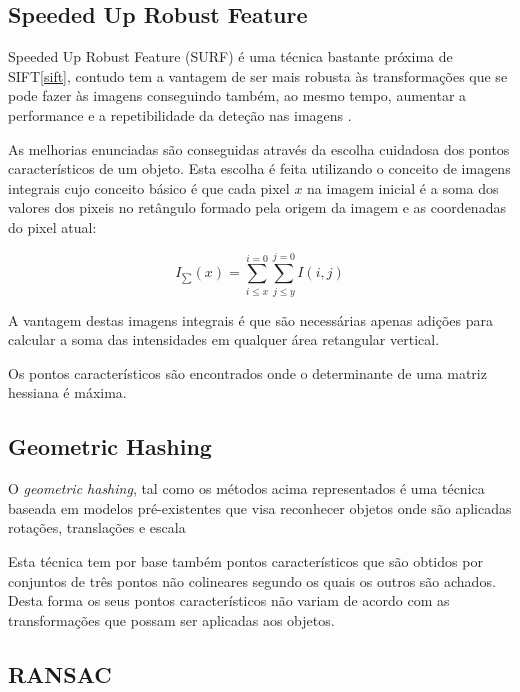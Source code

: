 \subsection[SURF]{Speeded Up Robust Feature}

Speeded Up Robust Feature (SURF) é uma técnica bastante próxima de SIFT\ref{sift}, contudo tem a vantagem de ser mais robusta às transformações que se pode fazer às imagens conseguindo também, ao mesmo tempo, aumentar a performance e a repetibilidade da deteção nas imagens \cite{citeulike:973069}.

As melhorias enunciadas são conseguidas através da escolha cuidadosa dos pontos característicos de um objeto. Esta escolha é feita utilizando o conceito de imagens integrais \cite{10.1109CVPR.2001.990517} cujo conceito básico é que cada pixel $x$ na imagem inicial é a soma dos valores dos pixeis no retângulo formado pela origem da imagem e as coordenadas do pixel atual:

\[
I_\sum(x) = \sum_{i \leq x}^{i=0} \sum_{j \leq y}^{j=0} I(i,j)
\]


A vantagem destas imagens integrais é que são necessárias apenas adições
para calcular a soma das intensidades em qualquer área retangular vertical.

Os pontos característicos são encontrados onde o determinante de uma matriz
hessiana é máxima.


\subsection{Geometric Hashing}

O \emph{geometric hashing}, tal como os métodos acima representados é uma técnica baseada
em modelos pré-existentes que visa reconhecer objetos onde são aplicadas rotações,
translações e escala \cite{1989SPIE.1095..515C}

Esta técnica tem por base também pontos característicos que são obtidos por
conjuntos de três pontos não colineares segundo os quais os outros são achados. 
Desta forma os seus pontos característicos não variam de acordo com as 
transformações que possam ser aplicadas aos objetos.



\subsection{RANSAC}

